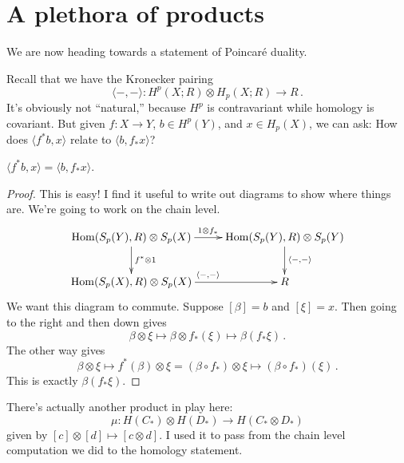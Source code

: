 \section{A plethora of products}

We are now heading towards a statement of Poincar\'e duality.

Recall that we have the Kronecker pairing 
\[
\langle-,-\rangle: H^p(X;R)\otimes H_p(X;R)\to R\,.
\]
It's obviously not ``natural,'' because $ H^p$ is contravariant while homology is covariant. But given $f:X\to Y$, $b\in H^p(Y)$, and $x\in H_p(X)$, we can ask: How does $\langle f^\ast b,x\rangle$ relate to $\langle b,f_\ast x\rangle$?
\begin{claim}
$\langle f^\ast b,x\rangle=\langle b,f_\ast x\rangle$.
\end{claim}
\begin{proof}
This is easy! I find it useful to write out diagrams to show where things are. We're going to work on the chain level.
\begin{equation*}
	\xymatrix{
\Hom(S_p(Y),R)\otimes S_p(X)\ar[r]^{1\otimes f_\ast}\ar[d]^{f^\ast\otimes 1} & 
\Hom(S_p(Y),R)\otimes S_p(Y)\ar[d]^{\langle-,-\rangle} \\
\Hom(S_p(X),R)\otimes S_p(X)\ar[r]^{\langle-,-\rangle} & R
	}
\end{equation*}
We want this diagram to commute. Suppose $[\beta]=b$ and $[\xi]=x$. Then 
going to the right and then down gives 
\[
\beta\otimes\xi\mapsto\beta\otimes f_\ast(\xi)\mapsto\beta(f_\ast\xi)\,.
\]
The other way gives 
\[
\beta\otimes\xi\mapsto f^\ast(\beta)\otimes\xi=(\beta\circ f_*)\otimes\xi\mapsto(\beta\circ f_*)(\xi)\,.
\]
This is exactly $\beta(f_\ast\xi)$.
\end{proof}
There's actually another product in play here: 
\[
\mu:H(C_\ast)\otimes H(D_\ast)\to H(C_\ast\otimes D_\ast)
\]
given by $[c]\otimes [d]\mapsto[c\otimes d]$. I used it to pass from the 
chain level computation we did to the homology statement.

